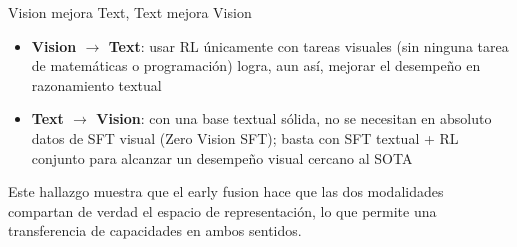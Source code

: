\begin{importantbox}{Vision mejora Text, Text mejora Vision}
\begin{itemize}
    \item \textbf{Vision $\rightarrow$ Text}: usar RL únicamente con tareas visuales (sin ninguna tarea de matemáticas o programación) logra, aun así, mejorar el desempeño en razonamiento textual
    \item \textbf{Text $\rightarrow$ Vision}: con una base textual sólida, no se necesitan en absoluto datos de SFT visual (Zero Vision SFT); basta con SFT textual + RL conjunto para alcanzar un desempeño visual cercano al SOTA
\end{itemize}
Este hallazgo muestra que el early fusion hace que las dos modalidades compartan de verdad el espacio de representación, lo que permite una transferencia de capacidades en ambos sentidos.
\end{importantbox}

